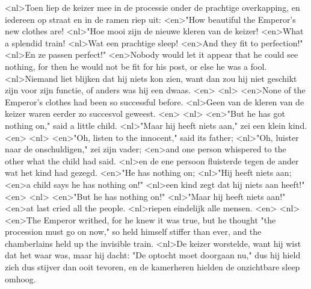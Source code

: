 <nl>Toen liep de keizer mee in de processie onder de prachtige overkapping, en iedereen op straat en in de ramen riep uit:
<en>"How beautiful the Emperor's new clothes are!
<nl>"Hoe mooi zijn de nieuwe kleren van de keizer!
<en>What a splendid train!
<nl>Wat een prachtige sleep!
<en>And they fit to perfection!"
<nl>En ze passen perfect!"
<en>Nobody would let it appear that he could see nothing, for then he would not be fit for his post, or else he was a fool.
<nl>Niemand liet blijken dat hij niets kon zien, want dan zou hij niet geschikt zijn voor zijn functie, of anders was hij een dwaas.
<en>
<nl>
<en>None of the Emperor's clothes had been so successful before.
<nl>Geen van de kleren van de keizer waren eerder zo succesvol geweest.
<en>
<nl>
<en>"But he has got nothing on," said a little child.
<nl>"Maar hij heeft niets aan," zei een klein kind.
<en>
<nl>
<en>"Oh, listen to the innocent," said its father;
<nl>"Oh, luister naar de onschuldigen," zei zijn vader;
<en>and one person whispered to the other what the child had said.
<nl>en de ene persoon fluisterde tegen de ander wat het kind had gezegd.
<en>"He has nothing on;
<nl>"Hij heeft niets aan;
<en>a child says he has nothing on!"
<nl>een kind zegt dat hij niets aan heeft!"
<en>
<nl>
<en>"But he has nothing on!"
<nl>"Maar hij heeft niets aan!"
<en>at last cried all the people.
<nl>riepen eindelijk alle mensen.
<en>
<nl>
<en>The Emperor writhed, for he knew it was true, but he thought "the procession must go on now," so held himself stiffer than ever, and the chamberlains held up the invisible train.
<nl>De keizer worstelde, want hij wist dat het waar was, maar hij dacht: "De optocht moet doorgaan nu," dus hij hield zich dus stijver dan ooit tevoren, en de kamerheren hielden de onzichtbare sleep omhoog.
